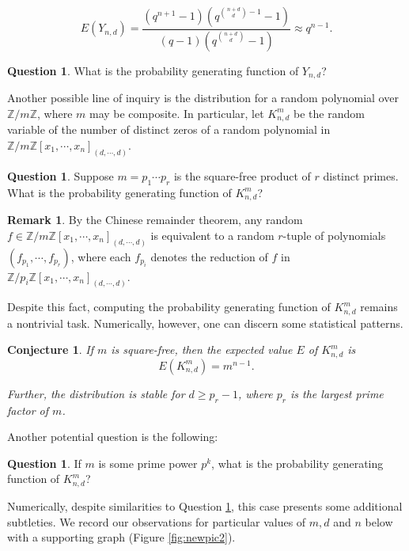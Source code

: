 \documentclass[12pt]{amsart}
\newtheorem{conjecture}[theorem]{Conjecture}
\theoremstyle{definition}
\newtheorem{question}[theorem]{Question}
\newtheorem{remark}[theorem]{Remark}
\newcommand{\ZZ}{\mathbb{Z} }
\begin{document}
\[
E(Y_{n, d}) = \frac{\left( q^{n+1}-1 \right)\left( q^{\binom{n+d}{d}-1}-1 \right)}{\left( q-1 \right)\left( q^{\binom{n+d}{d}}-1 \right)} \approx q^{n-1}.
\]

\begin{question}\label{que:projective}
What is the probability generating function of $Y_{n,d}$?
\end{question}

Another possible line of inquiry is the distribution for a random polynomial over $\ZZ/ m \ZZ$, where $m$ may be composite. In particular, let $K_{n,d}^m$ be the random variable of the number of distinct zeros of a random polynomial in $\ZZ/ m \ZZ[x_1, \cdots, x_n]_{(d, \cdots , d)}$. 

\begin{question}\label{que:squarefree}
Suppose $m = p_1 \cdots p_r$ is the square-free product of $r$ distinct primes. What is the probability generating function of $K_{n,d}^m$?
\end{question}

\begin{remark}\label{rmk: squarefree}
By the Chinese remainder theorem, any random $f \in \ZZ/ m \ZZ[x_1, \cdots, x_n]_{(d, \cdots , d)}$ is equivalent to a random $r$-tuple of polynomials $(f_{p_{1}}, \cdots , f_{p_{r}})$, where each $f_{p_{i}}$ denotes the reduction of $f$ in $\ZZ/ p_i \ZZ[x_1, \cdots, x_n]_{(d, \cdots , d)}$.
\end{remark}

Despite this fact, computing the probability generating function of  $K_{n,d}^m$ remains a nontrivial task. Numerically, however, one can discern some statistical patterns. 

\begin{conjecture}\label{conj: squarefree}
If $m$ is square-free, then the expected value $E$ of $K_{n,d}^m$ is
\[
    E(K_{n,d}^m) = m^{n-1}.
\]

Further, the distribution is stable for $d \ge p_r - 1$, where $p_r$ is the largest prime factor of $m$.
\end{conjecture}

Another potential question is the following:

\begin{question}\label{que:primepower}
If $m$ is some prime power $p^k$, what is the probability generating function of $K_{n,d}^m$?
\end{question}

Numerically, despite similarities to Question \ref{que:squarefree}, this case presents some additional subtleties. We record our observations for particular values of $m, d$ and $n$ below with a supporting graph (Figure \ref{fig:newpic2}).
\end{document}
